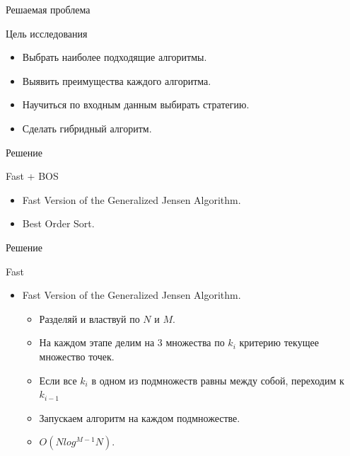\documentclass{beamer}
\begin{document}
\begin{frame}{Решаемая проблема}
\begin{block}{Цель исследования}
\begin{itemize}
\item Выбрать наиболее подходящие алгоритмы.
\item Выявить преимущества каждого алгоритма.
\item Научиться по входным данным выбирать стратегию.
\item Сделать гибридный алгоритм.
\end{itemize}
\end{block}
\end{frame}


\begin{frame}{Решение}
\begin{block}{Fast + BOS}
\begin{center}
\end{center}
\begin{itemize}
\item Fast Version of the Generalized Jensen Algorithm. %
\item Best Order Sort.
\end{itemize}
\end{block}
\end{frame}

\begin{frame}{Решение}
\begin{block}{Fast}
\begin{center}
\end{center}
\begin{itemize}
\item Fast Version of the Generalized Jensen Algorithm.
\begin{itemize}
\item Разделяй и властвуй по $N$ и $M$. 
\item На каждом этапе делим на 3 множества по $k_i$ критерию текущее множество точек.
\item Если все $k_i$ в одном из подмножеств равны между собой, переходим к $k_{i-1}$
\item Запускаем алгоритм на каждом подмножестве.
\item $O(N log^{M-1}N)$.
\end{itemize}
\end{itemize}
\end{block}
\end{frame}
\end{document}

